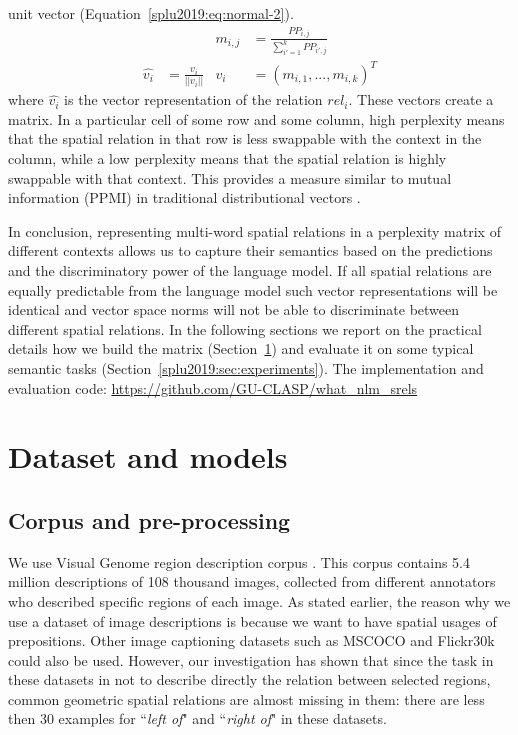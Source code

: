 unit vector (Equation~\ref{splu2019:eq:normal-2}).
\begin{align}
   & & m_{i,j} &= \frac{PP_{i,j}}{\sum_{i'=1}^{k} {PP_{i',j}}}\label{splu2019:eq:normal-1} \\
  \hat{v_i} &= \frac{v_i}{||v_i||} & v_i &= (m_{i,1}, ..., m_{i,k})^T\label{splu2019:eq:normal-2}
\end{align}
\noindent where $\hat{v_i}$ is the vector representation of the relation
$rel_i$. These vectors
create a matrix.
In a particular cell of some row and some column, high perplexity
means that the spatial relation in that row is less swappable with the
context in the column, while a low perplexity means that the spatial relation is highly
swappable with that context. This provides a measure similar to mutual
information (PPMI) in traditional distributional vectors \cite{church1990word}.






In conclusion, representing multi-word spatial relations in a perplexity matrix
of different contexts allows us to capture their semantics based on the
predictions and the discriminatory power of the language model. If all spatial
relations are equally predictable from the language model such vector
representations will be identical and vector space norms will not be able to
discriminate between different spatial relations. In the following sections we
report on the practical details how we build the matrix
(Section~\ref{splu2019:sec:model}) and evaluate it on some typical semantic tasks
(Section~\ref{splu2019:sec:experiments}).
The implementation and evaluation code:
\url{https://github.com/GU-CLASP/what_nlm_srels}

\section{Dataset and models}\label{splu2019:sec:model}

\subsection{Corpus and pre-processing}\label{splu2019:sec:preprocessing}
We use Visual Genome region description corpus \cite{krishna2017visual}. This
corpus contains 5.4 million descriptions of 108 thousand images, collected from
different annotators who described specific regions of each image.
As stated earlier, the reason why we use a dataset of image descriptions is because we want to have spatial
usages of prepositions. Other image captioning datasets such as %
MSCOCO
\cite{lin2014microsoft} and Flickr30k \cite{plummer2015flickr30k} could also be used. However, our investigation has shown that since the task in these datasets in not to describe directly the relation between selected regions,
common geometric spatial relations are almost missing in them: %
there are less
then 30 examples for ``\emph{left of}" and ``\emph{right of}" in these
datasets.

